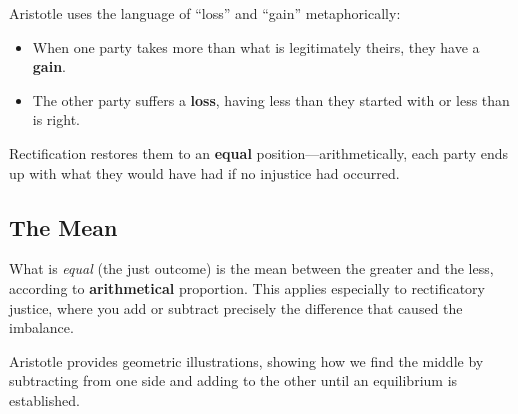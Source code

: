                     Aristotle uses the language of ``loss'' and ``gain'' metaphorically:
                    \begin{itemize}
                      \item When one party takes more than what is legitimately theirs, they have a \textbf{gain}.
                      \item The other party suffers a \textbf{loss}, having less than they started with or less than is right.
                    \end{itemize}
                    
                    Rectification restores them to an \textbf{equal} position---arithmetically, each party ends up with what they would have had if no injustice had occurred.

            \subsection{The Mean}

                What is \textit{equal} (the just outcome) is the mean between the greater and the less, according to \textbf{arithmetical} proportion. This applies especially to rectificatory justice, where you add or subtract precisely the difference that caused the imbalance.

                Aristotle provides geometric illustrations, showing how we find the middle by subtracting from one side and adding to the other until an equilibrium is established.

